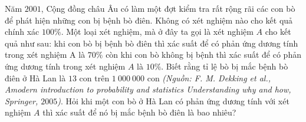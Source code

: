 \begin{bt}[CD]%
	Năm $2001$, Cộng đồng châu Âu có làm một đợt kiểm tra rất rộng rãi các con bò để phát hiện những con bị bệnh bò điên. Không có xét nghiệm nào cho kết quả chính xác $100 \%$. Một loại xét nghiệm, mà ở đây ta gọi là xét nghiệm $A$ cho kết quả như sau: khi con bò bị bệnh bò điên thì xác suất để có phản ứng dương tính trong xét nghiệm A là $70 \%$ còn khi con bò không bị bệnh thì xác suất để có phản ứng dương tính trong xét nghiệm $A$ là $10 \%$. Biết rằng tỉ lệ bò bị mắc bệnh bò điên ở Hà Lan là $13$ con trên $1~000~000$ con \textit{(Nguồn: F. M. Dekking et al., Amodern introduction to probability and statistics Understanding why and how, Springer, $2005$)}. Hỏi khi một con bò ở Hà Lan có phản ứng dương tính với xét nghiệm $A$ thì xác suất để nó bị mắc bệnh bò điên là bao nhiêu?
\end{bt}

